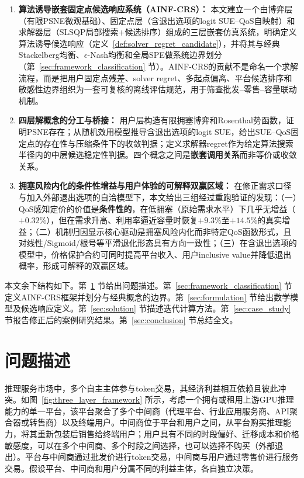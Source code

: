 \documentclass[UTF8,11pt]{ctexart}
\begin{document}
\begin{enumerate}[leftmargin=2em]
  \item \textbf{算法诱导嵌套固定点候选响应系统（AINF-CRS）：} 本文建立一个由博弈层（有限PSNE微观基础）、固定点层（含退出选项的logit SUE--QoS自映射）和求解器层（SLSQP局部搜索+候选排序）组成的三层嵌套仿真系统，明确定义算法诱导候选响应（定义~\ref{def:solver_regret_candidate}），并将其与经典Stackelberg均衡、$\epsilon$-Nash均衡和全局SPE做系统边界划分（第~\ref{sec:framework_classification} 节）。AINF-CRS的贡献不是命名一个求解流程，而是把用户固定点残差、solver regret、多起点偏离、平台候选排序和敏感性边界组织为一套可复核的离线评估规范，用于筛查批发--零售--容量联动机制。
  \item \textbf{四层解概念的分工与桥接：} 用户层构造有限拥塞博弈和Rosenthal势函数，证明PSNE存在；从随机效用模型推导含退出选项的logit SUE，给出SUE--QoS固定点的存在性与压缩条件下的收敛判据；定义求解器regret作为给定算法搜索半径内的中层候选稳定性判据。四个概念之间是\textbf{嵌套调用关系}而非等价或收敛关系。
  \item \textbf{拥塞风险内化的条件性增益与用户体验的可解释双赢区域：} 在修正需求口径与加入外部退出选项的自洽模型下，本文给出三组经过重跑验证的发现：（一）QoS感知定价的价值是\textbf{条件性的}，在低拥塞（原始需求水平）下几乎无增益（$+0.32\%$），但在需求升高、利用率逼近容量时恢复$+9.3\%$至$+14.5\%$的真实增益；（二）机制归因显示核心驱动是拥塞风险内化而非特定QoS函数形式，且对线性/Sigmoid/根号等平滑退化形态具有方向一致性；（三）在含退出选项的模型中，价格保护合约可同时提高平台收入、用户inclusive value并降低退出概率，形成可解释的双赢区域。
\end{enumerate}

本文余下结构如下。第~\ref{sec:problem} 节给出问题描述。第~\ref{sec:framework_classification} 节定义AINF-CRS框架并划分与经典概念的边界。第~\ref{sec:formulation} 节给出数学模型及候选响应定义。第~\ref{sec:solution} 节描述迭代计算方法。第~\ref{sec:case_study} 节报告修正后的案例研究结果。第~\ref{sec:conclusion} 节总结全文。


\section{问题描述}
\label{sec:problem}

推理服务市场中，多个自主主体参与token交易，其经济利益相互依赖且彼此冲突。如图~\ref{fig:three_layer_framework} 所示，考虑一个拥有或租用上游GPU推理能力的单一平台，该平台聚合了多个中间商（代理平台、行业应用服务商、API聚合器或转售商）以及终端用户。中间商位于平台和用户之间，从平台购买推理能力，将其重新包装后销售给终端用户；用户具有不同的时段偏好、迁移成本和价格敏感度，可以在多个中间商、多个时段之间选择，也可以选择不购买（外部退出）。平台与中间商通过批发价进行token交易，中间商与用户通过零售价进行服务交易。假设平台、中间商和用户分属不同的利益主体，各自独立决策。
\end{document}
